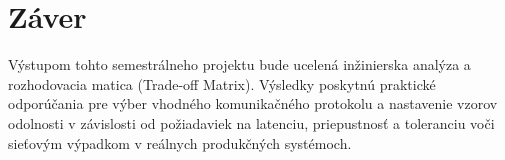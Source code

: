 \section{Záver} \label{s: zaver}

Výstupom tohto semestrálneho projektu bude ucelená inžinierska analýza a rozhodovacia matica (Trade-off Matrix). Výsledky poskytnú praktické odporúčania pre výber vhodného komunikačného protokolu a nastavenie vzorov odolnosti v závislosti od požiadaviek na latenciu, priepustnosť a toleranciu voči sieťovým výpadkom v reálnych produkčných systémoch.